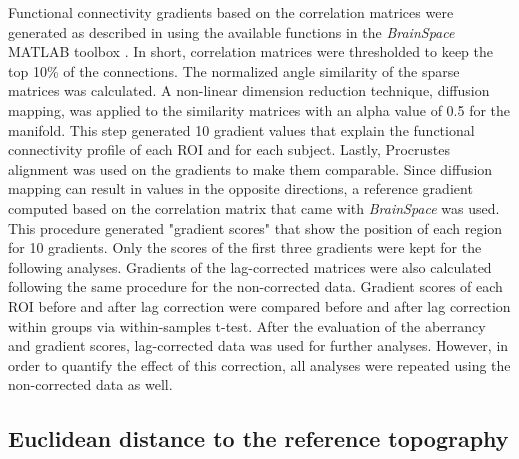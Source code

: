 \documentclass[fleqn,10pt]{wlscirep}
\begin{document}
Functional connectivity gradients based on the correlation matrices were generated as described in \citet{margulies2016situating} using the available functions in the \emph{BrainSpace} MATLAB toolbox \citep{vos2020brainspace}. In short, correlation matrices were thresholded to keep the top 10\% of the connections. The normalized angle similarity of the sparse matrices was calculated. A non-linear dimension reduction technique, diffusion mapping, was applied to the similarity matrices with an alpha value of 0.5 for the manifold. This step generated 10 gradient values that explain the functional connectivity profile of each ROI and for each subject. Lastly, Procrustes alignment was used on the gradients to make them comparable. Since diffusion mapping can result in values in the opposite directions, a reference gradient computed based on the correlation matrix that came with \emph{BrainSpace} was used. This procedure generated "gradient scores" that show the position of each region for 10 gradients. Only the scores of the first three gradients were kept for the following analyses.
Gradients of the lag-corrected matrices were also calculated following the same procedure for the non-corrected data.  Gradient scores of each ROI before and after lag correction were compared before and after lag correction within groups via within-samples t-test. After the evaluation of the aberrancy and gradient scores,  lag-corrected data was used for further analyses. However, in order to quantify the effect of this correction, all analyses were repeated using the non-corrected data as well. 


\subsection*{Euclidean distance to the reference topography}
\end{document}
